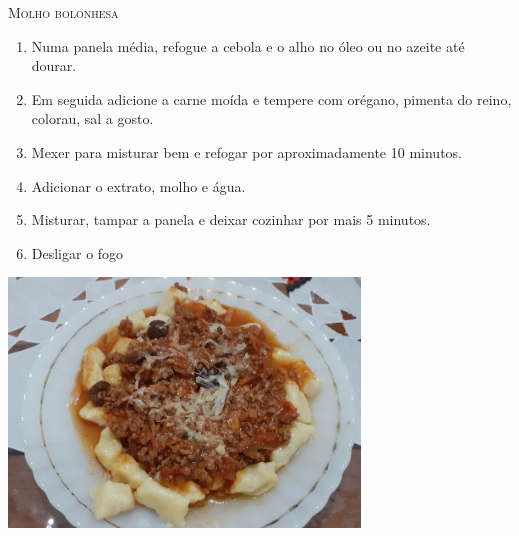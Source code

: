 {\textsc{Molho bolonhesa}
\begin{enumerate}
    \item Numa panela média, refogue a cebola e o alho no óleo ou no azeite até dourar.
    \item Em seguida adicione a carne moída e tempere com orégano, pimenta do reino, colorau, sal a gosto.
    \item Mexer para misturar bem e refogar por aproximadamente 10 minutos.
    \item Adicionar o extrato, molho e água.
    \item Misturar, tampar a panela e deixar cozinhar por mais 5 minutos.
    \item Desligar o fogo
\end{enumerate}

\begin{center}
    \includegraphics[width=0.7\textwidth]{Fotos/Nhoque.png}
\end{center}
}